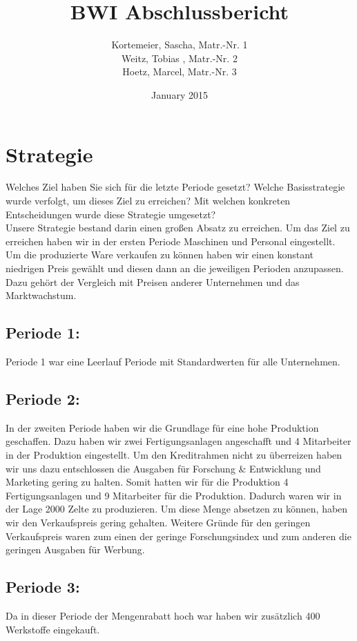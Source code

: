 \documentclass[a4paper, 12pt]{article}
\title{BWI Abschlussbericht}
\author{Kortemeier, Sascha, Matr.-Nr. 1 \\
Weitz, Tobias , Matr.-Nr. 2 \\
Hoetz, Marcel, Matr.-Nr. 3}
\date{January 2015}
\begin{document}
\maketitle

\section{Strategie}

Welches Ziel haben Sie sich für die letzte Periode gesetzt? 
Welche Basisstrategie wurde verfolgt, um dieses Ziel zu erreichen?
Mit welchen konkreten Entscheidungen wurde diese Strategie umgesetzt?
\\
Unsere Strategie bestand darin einen großen Absatz zu erreichen. 
Um das Ziel zu erreichen haben wir in der ersten Periode Maschinen und Personal eingestellt. 
Um die produzierte Ware verkaufen zu können haben wir einen konstant niedrigen Preis gewählt und diesen dann an die jeweiligen Perioden anzupassen. 
Dazu gehört der Vergleich mit Preisen anderer Unternehmen und das Marktwachstum. 

\subsection{Periode 1:}
Periode 1 war eine Leerlauf Periode mit Standardwerten für alle Unternehmen.	

\subsection{Periode 2:}
In der zweiten Periode haben wir die Grundlage für eine hohe Produktion geschaffen.
Dazu haben wir zwei Fertigungsanlagen angeschafft und 4 Mitarbeiter in der Produktion eingestellt.
Um den Kreditrahmen nicht zu überreizen haben wir uns dazu entschlossen die Ausgaben für Forschung \& Entwicklung und Marketing gering zu halten.
Somit hatten wir für die Produktion 4 Fertigungsanlagen und 9 Mitarbeiter für die Produktion.
Dadurch waren wir in der Lage 2000 Zelte zu produzieren.
Um diese Menge absetzen zu können, haben wir den Verkaufspreis gering gehalten.
Weitere Gründe für den geringen Verkaufspreis waren zum einen der geringe Forschungsindex und zum anderen die geringen Ausgaben für Werbung.

\subsection{Periode 3:}
Da in dieser Periode der Mengenrabatt hoch war haben wir zusätzlich 400 Werkstoffe eingekauft. 
\end{document}
